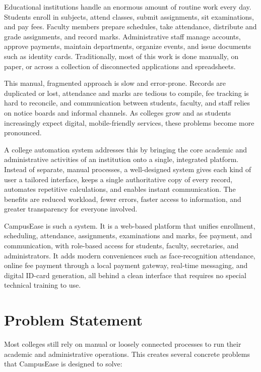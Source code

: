 \documentclass[12pt,a4paper]{report}
\begin{document}
Educational institutions handle an enormous amount of routine work every day. Students enroll in subjects, attend classes, submit assignments, sit examinations, and pay fees. Faculty members prepare schedules, take attendance, distribute and grade assignments, and record marks. Administrative staff manage accounts, approve payments, maintain departments, organize events, and issue documents such as identity cards. Traditionally, most of this work is done manually, on paper, or across a collection of disconnected applications and spreadsheets.

This manual, fragmented approach is slow and error-prone. Records are duplicated or lost, attendance and marks are tedious to compile, fee tracking is hard to reconcile, and communication between students, faculty, and staff relies on notice boards and informal channels. As colleges grow and as students increasingly expect digital, mobile-friendly services, these problems become more pronounced.

A college automation system addresses this by bringing the core academic and administrative activities of an institution onto a single, integrated platform. Instead of separate, manual processes, a well-designed system gives each kind of user a tailored interface, keeps a single authoritative copy of every record, automates repetitive calculations, and enables instant communication. The benefits are reduced workload, fewer errors, faster access to information, and greater transparency for everyone involved.

CampusEase is such a system. It is a web-based platform that unifies enrollment, scheduling, attendance, assignments, examinations and marks, fee payment, and communication, with role-based access for students, faculty, secretaries, and administrators. It adds modern conveniences such as face-recognition attendance, online fee payment through a local payment gateway, real-time messaging, and digital ID-card generation, all behind a clean interface that requires no special technical training to use.

\section{Problem Statement}

Most colleges still rely on manual or loosely connected processes to run their academic and administrative operations. This creates several concrete problems that CampusEase is designed to solve:
\end{document}
